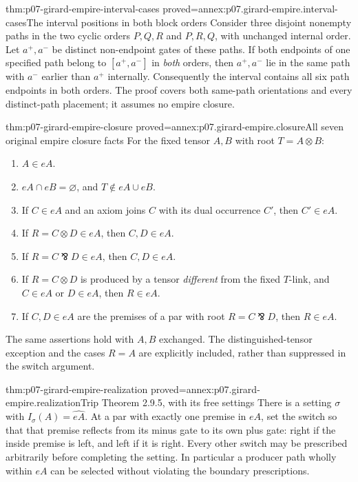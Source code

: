 \begin{hblemma}{thm:p07-girard-empire-interval-cases}
 {proved=annex:p07.girard-empire.interval-cases}{The interval positions in both block orders}
Consider three disjoint nonempty paths in the two cyclic orders
\(P,Q,R\) and \(P,R,Q\), with unchanged internal order.
Let \(a^+,a^-\) be distinct non-endpoint gates of these paths.
If both endpoints of one specified path belong to
\([a^+,a^-]\) in \emph{both} orders, then \(a^+,a^-\) lie in the
same path with \(a^-\) earlier than \(a^+\) internally.
Consequently the interval contains all six path endpoints in both orders.
The proof covers both same-path orientations and every distinct-path
placement; it assumes no empire closure.
\end{hblemma}

\begin{hblemma}{thm:p07-girard-empire-closure}
 {proved=annex:p07.girard-empire.closure}{All seven original empire closure facts}
For the fixed tensor \(A,B\) with root \(T=A\otimes B\):
\begin{enumerate}
\item \(A\in eA\).
\item \(eA\cap eB=\varnothing\), and \(T\notin eA\cup eB\).
\item If \(C\in eA\) and an axiom joins \(C\) with its dual occurrence
      \(C'\), then \(C'\in eA\).
\item If \(R=C\otimes D\in eA\), then \(C,D\in eA\).
\item If \(R=C\bindnasrepma D\in eA\), then \(C,D\in eA\).
\item If \(R=C\otimes D\) is produced by a tensor \emph{different}
      from the fixed \(T\)-link, and \(C\in eA\) or \(D\in eA\),
      then \(R\in eA\).
\item If \(C,D\in eA\) are the premises of a par with root
      \(R=C\bindnasrepma D\), then \(R\in eA\).
\end{enumerate}
The same assertions hold with \(A,B\) exchanged.
The distinguished-tensor exception and the cases \(R=A\) are
explicitly included, rather than suppressed in the switch argument.
\end{hblemma}

\begin{hbtheorem}{thm:p07-girard-empire-realization}
 {proved=annex:p07.girard-empire.realization}{Trip Theorem 2.9.5, with its free settings}
There is a setting \(\sigma\) with
\(I_\sigma(A)=\widehat{eA}\).
At a par with exactly one premise in \(eA\), set the switch so that
that premise reflects from its minus gate to its own plus gate:
right if the inside premise is left, and left if it is right.
Every other switch may be prescribed arbitrarily before completing
the setting. In particular a producer path wholly within \(eA\)
can be selected without violating the boundary prescriptions.
\end{hbtheorem}

